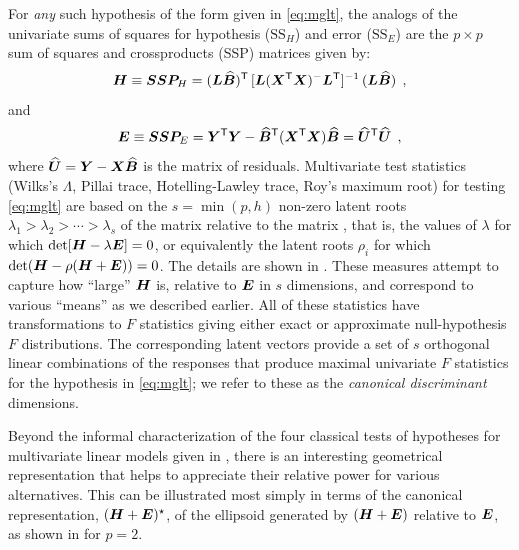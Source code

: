 For \emph{any} such hypothesis of the form given in \eqref{eq:mglt}, the analogs of the univariate
sums of squares for hypothesis ($\mathrm{SS}_H$) and error ($\mathrm{SS}_E$)
are the $p \times p$  sum of squares and crossproducts (SSP) matrices given by:
\begin{equation} \label{eq:hmat}
\bm{H}  \equiv \bm{SSP}_H =
 (\bm{L} \widehat{\bm{B}})^\mathsf{T} \,
 [\bm{L} (\bm{X}^\mathsf{T} \bm{X} )^{-} \bm{L}^\mathsf{T}]^{-1} \,
 (\bm{L} \widehat{\bm{B}})
 \:\: ,
\end{equation}
and
\begin{equation} \label{eq:emat}
\bm{E}  \equiv \bm{SSP}_E =
 \bm{Y}^\mathsf{T} \bm{Y} -
 \widehat{\bm{B}}^\mathsf{T} (\bm{X}^\mathsf{T} \bm{X}) \widehat{\bm{B}}
 =
  \widehat{\bm{U}}^\mathsf{T}  \widehat{\bm{U}}
 \:\: ,
\end{equation}
where $\widehat{\bm{U}} = \bm{Y} - \bm{X} \widehat{\bm{B}}$ is the matrix of residuals.
Multivariate test statistics (Wilks's $\Lambda$, Pillai trace, Hotelling-Lawley trace, Roy's maximum root)
for testing \eqref{eq:mglt} are based on the $s = \min(p, h)$ non-zero latent roots
$\lambda_{1}>\lambda_{2}>\cdots>\lambda_{s}$ of
the matrix  relative to the matrix , that is,
the values of $\lambda$ for which $
\mathrm{det} [\bm{H}-\lambda\bm{E}]=0$, or equivalently
the latent roots $\rho_i$ for which $\mathrm{det} (\bm{H} - \rho (\bm{H}+\bm{E}))=0$.
The details are shown in .
These measures
attempt to capture how ``large'' $\bm{H}$ is, relative to
$\bm{E}$ in $s$ dimensions, and correspond to various ``means'' as we described earlier.
All of these statistics have transformations to $F$ statistics
giving either exact or approximate null-hypothesis $F$ distributions.
The corresponding latent vectors provide a
set of $s$ orthogonal linear combinations of the responses that produce
maximal univariate $F$ statistics for the hypothesis in \eqref{eq:mglt};
we refer to these as the \emph{canonical discriminant} dimensions.



Beyond the informal characterization of the four classical tests of hypotheses for multivariate linear models given in
, there is an interesting geometrical representation 
that helps to appreciate their relative power for various alternatives.  
This can be illustrated most simply in terms of 
the canonical representation,  $(\bm{H}+\bm{E})^\star$,
of the ellipsoid generated by $(\bm{H} + \bm{E})$ relative to $\bm{E}$,
as shown in  for $p=2$. 

